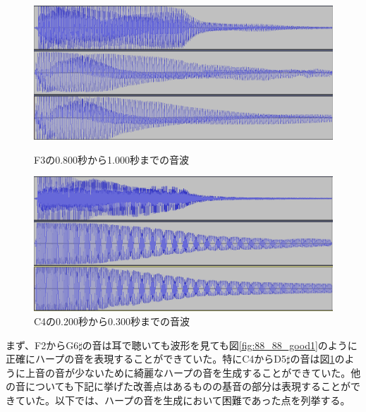 \begin{figure}[t]
\begin{center}
\begin{minipage}{0.48\hsize}
\begin{center}
\includegraphics[width=0.9\hsize]{figure/88_88/f3.png}
\caption{F3の0.800秒から1.000秒までの音波}
\label{fig:88_88_good1}
\end{center}
\end{minipage}
\begin{minipage}{0.48\hsize}
\begin{center}
\includegraphics[width=0.9\hsize]{figure/88_88/c4.png}
\caption{C4の0.200秒から0.300秒までの音波}
\label{fig:88_88_good2}
\end{center}
\end{minipage}
\end{center}
\end{figure}


まず、F2からG6$\sharp$の音は耳で聴いても波形を見ても図\ref{fig:88_88_good1}のように正確にハープの音を表現することができていた。特にC4からD5$\sharp$の音は図\ref{fig:88_88_good2}のように上音の音が少ないために綺麗なハープの音を生成することができていた。他の音についても下記に挙げた改善点はあるものの基音の部分は表現することができていた。以下では、ハープの音を生成において困難であった点を列挙する。


